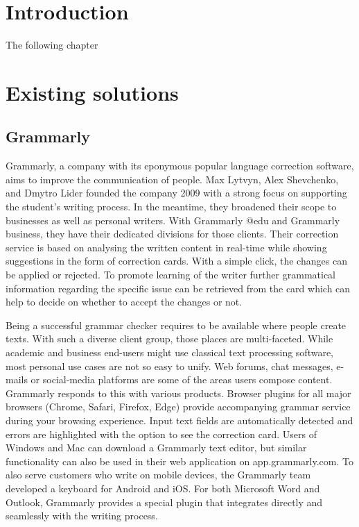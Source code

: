 \documentclass[runningheads]{llncs}
\begin{document}
\section{Introduction}\label{sec:outl}
The following chapter 

\newpage


\section{Existing solutions}
\subsection{Grammarly}
Grammarly, a company with its eponymous popular language correction software, aims to improve the communication of people. Max Lytvyn, Alex Shevchenko, and Dmytro Lider founded the company 2009 with a strong focus on supporting the student's writing process. In the meantime, they broadened their scope to businesses as well as personal writers. With Grammarly @edu and Grammarly business, they have their dedicated divisions for those clients. Their correction service is based on analysing the written content in real-time while showing suggestions in the form of correction cards.  With a simple click, the changes can be applied or rejected. To promote learning of the writer further grammatical information regarding the specific issue can be retrieved from the card which can help to decide on whether to accept the changes or not. \citep{noauthor_grammarly._nodate}

Being a successful grammar checker requires to be available where people create texts. With such a diverse client group, those places are multi-faceted. While academic and business end-users might use classical text processing software, most personal use cases are not so easy to unify. Web forums, chat messages, e-mails or social-media platforms are some of the areas users compose content. Grammarly responds to this with various products. Browser plugins for all major browsers (Chrome, Safari, Firefox, Edge) provide accompanying grammar service during your browsing experience. Input text fields are automatically detected and errors are highlighted with the option to see the correction card. Users of Windows and Mac can download a Grammarly text editor, but similar functionality can also be used in their web application on app.grammarly.com. To also serve customers who write on mobile devices, the Grammarly team developed a keyboard for Android and iOS. For both Microsoft Word and Outlook, Grammarly provides a special plugin that integrates directly and seamlessly with the writing process.
\end{document}
